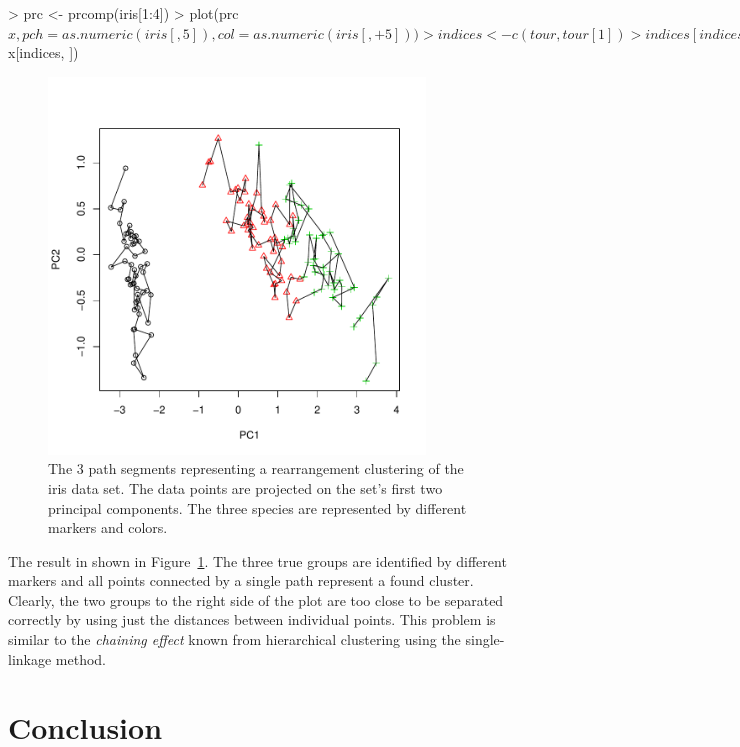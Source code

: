 \documentclass[10pt,a4paper,fleqn]{article}
\begin{document}
\begin{Schunk}
\begin{Sinput}
> prc <- prcomp(iris[1:4])
> plot(prc$x, pch = as.numeric(iris[, 5]), col = as.numeric(iris[, 
+     5]))
> indices <- c(tour, tour[1])
> indices[indices > 150] <- NA
> lines(prc$x[indices, ])
\end{Sinput}
\end{Schunk}

\begin{figure}
\centering
\includegraphics[width=10cm, trim=0 20 0 0]{TSP-clustering2}
\caption{The 3 path segments representing a rearrangement clustering of the
iris data set.  The data points are projected on the set's first two principal
components.  The three species are represented by different markers and
colors.}
\label{fig:clustering2}
\end{figure}

The result in shown in Figure~\ref{fig:clustering2}. The three true groups are
identified by different markers and all points connected by a single path
represent a found cluster.  Clearly, the two groups to the right side of the
plot are too close to be separated correctly by using just the distances
between individual points.  This problem is similar to the \emph{chaining
effect} known from hierarchical clustering using the single-linkage
method.





\section{Conclusion}\label{sec:conclusion}
\end{document}
